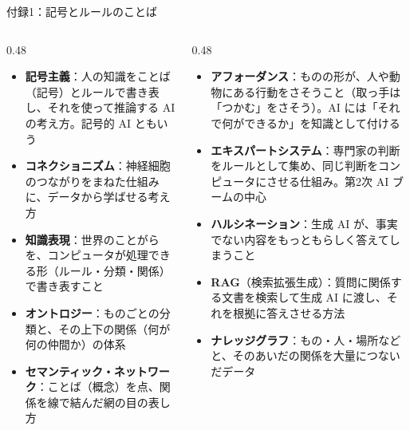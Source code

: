 \documentclass[aspectratio=169]{beamer}
\begin{document}


\begin{frame}{付録1：記号とルールのことば}
\footnotesize
\begin{columns}[t]
\begin{column}{0.48\textwidth}
\begin{itemize}\footnotesize
  \item \textbf{記号主義}：人の知識をことば（記号）とルールで書き表し、それを使って推論する AI の考え方。記号的 AI ともいう
  \item \textbf{コネクショニズム}：神経細胞のつながりをまねた仕組みに、データから学ばせる考え方
  \item \textbf{知識表現}：世界のことがらを、コンピュータが処理できる形（ルール・分類・関係）で書き表すこと
  \item \textbf{オントロジー}：ものごとの分類と、その上下の関係（何が何の仲間か）の体系
  \item \textbf{セマンティック・ネットワーク}：ことば（概念）を点、関係を線で結んだ網の目の表し方
\end{itemize}
\end{column}
\begin{column}{0.48\textwidth}
\begin{itemize}\footnotesize
  \item \textbf{アフォーダンス}：ものの形が、人や動物にある行動をさそうこと（取っ手は「つかむ」をさそう）。AI には「それで何ができるか」を知識として付ける
  \item \textbf{エキスパートシステム}：専門家の判断をルールとして集め、同じ判断をコンピュータにさせる仕組み。第2次 AI ブームの中心
  \item \textbf{ハルシネーション}：生成 AI が、事実でない内容をもっともらしく答えてしまうこと
  \item \textbf{RAG}（検索拡張生成）：質問に関係する文書を検索して生成 AI に渡し、それを根拠に答えさせる方法
  \item \textbf{ナレッジグラフ}：もの・人・場所などと、そのあいだの関係を大量につないだデータ
\end{itemize}
\end{column}
\end{columns}
\end{frame}
\end{document}
